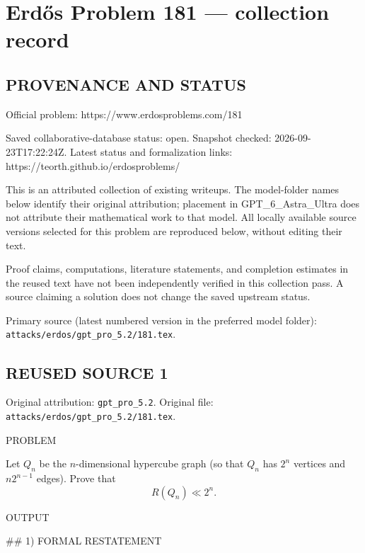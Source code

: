 \section*{Erd\H{o}s Problem 181 --- collection record}

\subsection*{PROVENANCE AND STATUS}
Official problem: https://www.erdosproblems.com/181

Saved collaborative-database status: open.
Snapshot checked: 2026-09-23T17:22:24Z.
Latest status and formalization links: https://teorth.github.io/erdosproblems/

This is an attributed collection of existing writeups. The model-folder names below identify their original attribution; placement in GPT\_6\_Astra\_Ultra does not attribute their mathematical work to that model. All locally available source versions selected for this problem are reproduced below, without editing their text.

Proof claims, computations, literature statements, and completion estimates in the reused text have not been independently verified in this collection pass. A source claiming a solution does not change the saved upstream status.

Primary source (latest numbered version in the preferred model folder): \texttt{attacks/erdos/gpt\_pro\_5.2/181.tex}.

\subsection*{REUSED SOURCE 1}
Original attribution: \texttt{gpt\_pro\_5.2}.
Original file: \texttt{attacks/erdos/gpt\_pro\_5.2/181.tex}.


PROBLEM

Let $Q_n$ be the $n$-dimensional hypercube graph (so that $Q_n$ has $2^n$ vertices and $n2^{n-1}$ edges). Prove that
\[R(Q_n) \ll 2^n.\]

OUTPUT

## 1) FORMAL RESTATEMENT

